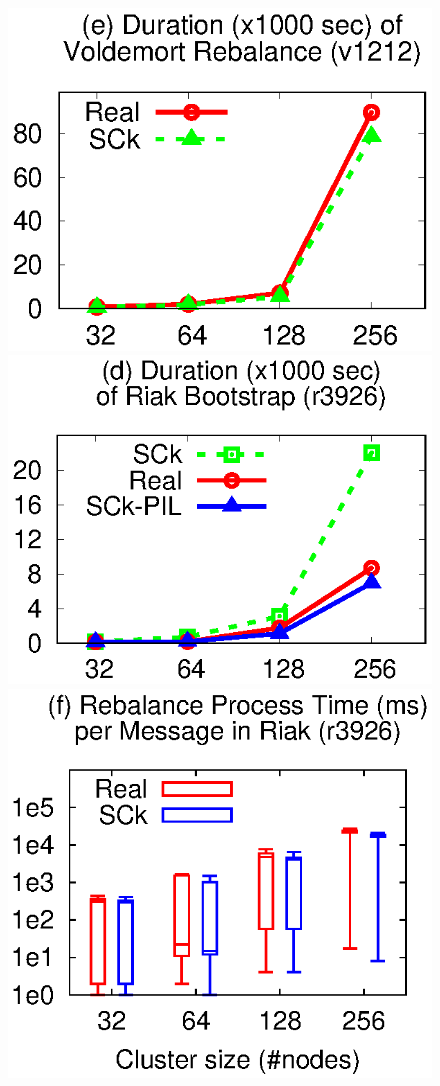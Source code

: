 \begin{figure}[t]
\centerline{
\hmina
\includegraphics[width=\fgw]{F/old-bugs/eps/vold1.eps}
\hminb
\includegraphics[width=\fgw]{F/old-bugs/eps/riak1.eps}
\includegraphics[width=\fgw]{F/riak/eps/proc.eps}
}


\end{figure}
